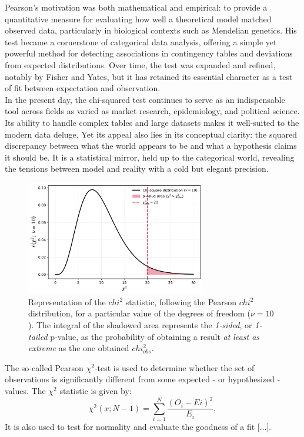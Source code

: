 \documentclass{book}
\begin{document}
Pearson’s motivation was both mathematical and empirical: to provide a quantitative measure for evaluating how well a theoretical model matched observed data, particularly in biological contexts such as Mendelian genetics. His test became a cornerstone of categorical data analysis, offering a simple yet powerful method for detecting associations in contingency tables and deviations from expected distributions. Over time, the test was expanded and refined, notably by Fisher and Yates, but it has retained its essential character as a test of fit between expectation and observation.\\

In the present day, the chi-squared test continues to serve as an indispensable tool across fields as varied as market research, epidemiology, and political science. Its ability to handle complex tables and large datasets makes it well-suited to the modern data deluge. Yet its appeal also lies in its conceptual clarity: the squared discrepancy between what the world appears to be and what a hypothesis claims it should be. It is a statistical mirror, held up to the categorical world, revealing the tensions between model and reality with a cold but elegant precision.\\

\begin{figure}[ht]
    \centering
    \includegraphics[width=0.7\textwidth]{figures/chapter4/chi2_test_one_tailed.png}
    \caption{Representation of the $chi^{2}$ statistic, following the Pearson  $chi^{2}$ distribution, for a particular value of the degrees of freedom ($\nu = 10$). The integral of the shadowed area represents the \textit{1-sided}, or \textit{1-tailed} p-value, as the probability of obtaining a result \textit{at least as extreme} as the one obtained $chi^{2}_{obs}$.}
    \label{fig:chi2_test1}
\end{figure}

The so-called Pearson $\chi^{2}$-test is used to determine whether the set of observations is significantly different from some expected - or hypothesized - values. The $\chi^{2}$ statistic is given by:
\[
    \chi^{2}(x; N - 1) = \sum_{i = 1}^{N}\frac{(O_{i} - E{i})^{2}}{E_i},
\]
It is also used to test for normality and evaluate the goodness of a fit [...].\\\
\end{document}
